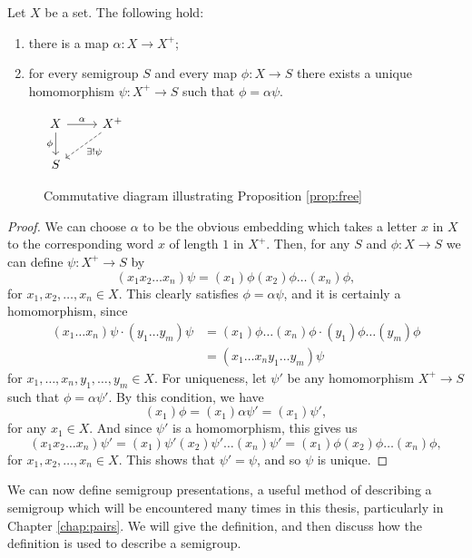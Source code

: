 \begin{proposition}
  \label{prop:free}
  Let $X$ be a set.  The following hold:
  \begin{enumerate}[\rm(1)]
  \item there is a map $\alpha: X \to X^+$;
  \item for every semigroup $S$ and every map $\phi: X \to S$ there exists a
    unique homomorphism $\psi: X^+ \to S$ such that $\phi = \alpha\psi$.
  \end{enumerate}
  \begin{figure}[h]
    \centering
    $
    \begin{tikzcd}
      X \ar[d, "\phi"'] \ar[r, "\alpha"]
      & X^+ \ar[ld, dashed, "\exists ! \psi"] \\ S
    \end{tikzcd}
    $
    \caption{Commutative diagram illustrating Proposition \ref{prop:free}}
    \label{fig:free}
  \end{figure}
  \begin{proof}
    We can choose $\alpha$ to be the obvious embedding which takes a letter $x$
    in $X$ to the corresponding word $x$ of length $1$ in $X^+$.  Then, for any
    $S$ and $\phi: X \to S$ we can define $\psi: X^+ \to S$ by
    $$(x_1 x_2 \ldots x_n)\psi = (x_1)\phi (x_2)\phi \ldots (x_n)\phi,$$
    for $x_1, x_2, \ldots, x_n \in X$.  This clearly satisfies
    $\phi = \alpha\psi$, and it is certainly a homomorphism, since
    \begin{align*}
      (x_1 \ldots x_n)\psi \cdot (y_1 \ldots y_m)\psi
      & = (x_1)\phi\ldots(x_n)\phi \cdot (y_1)\phi\ldots(y_m)\phi \\
      & = (x_1 \ldots x_ny_1 \ldots y_m)\psi
    \end{align*}
    for $x_1, \ldots, x_n, y_1, \ldots, y_m \in X$.  For uniqueness, let $\psi'$
    be any homomorphism $X^+ \to S$ such that $\phi = \alpha\psi'$.  By this
    condition, we have
    $$(x_1)\phi = (x_1)\alpha\psi' = (x_1)\psi',$$
    for any $x_1 \in X$.  And since $\psi'$ is a homomorphism, this gives us
    $$(x_1x_2\ldots x_n)\psi'
    = (x_1)\psi'(x_2)\psi'\ldots(x_n)\psi'
    = (x_1)\phi (x_2)\phi \ldots(x_n)\phi,$$
    for $x_1, x_2, \ldots, x_n \in X$.
    This shows that $\psi' = \psi$, and so $\psi$ is unique.
  \end{proof}
\end{proposition}

We can now define semigroup presentations, a useful method of describing a
semigroup which will be encountered many times in this thesis, particularly in
Chapter \ref{chap:pairs}.  We will give the definition, and then discuss how the
definition is used to describe a semigroup.


